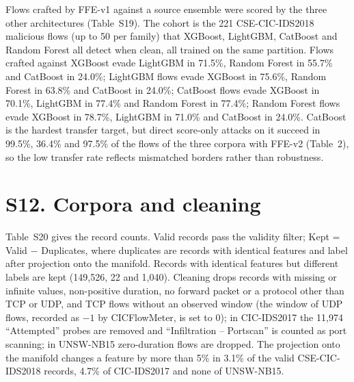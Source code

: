 Flows crafted by FFE-v1 against a source ensemble were scored by the three other architectures (Table~S19). The cohort is the 221 CSE-CIC-IDS2018 malicious flows (up to 50 per family) that XGBoost, LightGBM, CatBoost and Random Forest all detect when clean, all trained on the same partition. Flows crafted against XGBoost evade LightGBM in 71.5\%, Random Forest in 55.7\% and CatBoost in 24.0\%; LightGBM flows evade XGBoost in 75.6\%, Random Forest in 63.8\% and CatBoost in 24.0\%; CatBoost flows evade XGBoost in 70.1\%, LightGBM in 77.4\% and Random Forest in 77.4\%; Random Forest flows evade XGBoost in 78.7\%, LightGBM in 71.0\% and CatBoost in 24.0\%. CatBoost is the hardest transfer target, but direct score-only attacks on it succeed in 99.5\%, 36.4\% and 97.5\% of the flows of the three corpora with FFE-v2 (Table~2), so the low transfer rate reflects mismatched borders rather than robustness.

\begin{table}[!htbp]
\centering
\caption*{Table S19. Transferability of FFE-v1 flows (success rate in \%, $N=221$; diagonal: attack against the source model itself).}
\footnotesize
\resizebox{\columnwidth}{!}{%
%
}
\end{table}

\section*{S12. Corpora and cleaning}

Table~S20 gives the record counts. Valid records pass the validity filter; Kept = Valid $-$ Duplicates, where duplicates are records with identical features and label after projection onto the manifold. Records with identical features but different labels are kept (149,526, 22 and 1,040). Cleaning drops records with missing or infinite values, non-positive duration, no forward packet or a protocol other than TCP or UDP, and TCP flows without an observed window (the window of UDP flows, recorded as $-1$ by CICFlowMeter, is set to 0); in CIC-IDS2017 the 11,974 ``Attempted'' probes are removed and ``Infiltration -- Portscan'' is counted as port scanning; in UNSW-NB15 zero-duration flows are dropped. The projection onto the manifold changes a feature by more than 5\% in 3.1\% of the valid CSE-CIC-IDS2018 records, 4.7\% of CIC-IDS2017 and none of UNSW-NB15.

\begin{table}[!htbp]
\centering
\caption*{Table S20. Full-scale benchmark corpora.}
\footnotesize

\end{table}

